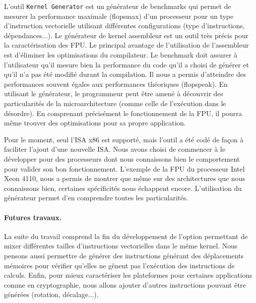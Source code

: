     L'outil \verb=Kernel Generator= est un générateur de benchmarks qui permet de mesurer la performance maximale (\gls{flopsmax})  d'un processeur pour un type d'instruction vectorielle utilisant différentes configurations (type d'instructions, dépendances...).
    Le générateur de kernel assembleur est un outil très précis pour la caractérisation des \gls{FPU}. Le principal avantage de l'utilisation de l'assembleur est d'éliminer les optimisations du compilateur. Le benchmark doit assurer à l'utilisateur qu'il mesure bien la performance du code qu'il a choisi de générer et qu'il n'a pas été modifié durant la compilation. Il nous a permis d'atteindre des performances souvent égales aux performances théoriques (\gls{flopspeak}). En utilisant le générateur, le programmeur peut être amené à découvrir des particularités de la microarchitecture (comme celle de l'exécution dans le désordre). En comprenant précisément le fonctionnement de la FPU, il pourra même trouver des optimisations pour sa propre application.
    
    Pour le moment, seul l'ISA x86 est supporté, mais l'outil a été codé de façon à faciliter l'ajout d'une nouvelle ISA. Nous avons choisi de commencer à le développer pour des processeurs dont nous connaissons bien le comportement pour valider son bon fonctionnement. L'exemple de la FPU du processeur Intel Xeon 4110, nous a permis de montrer que même sur des architectures que nous connaissons bien, certaines spécificités nous échappent encore. L'utilisation du générateur permet d'en comprendre toutes les particularités.
    
    
    \paragraph{Futures travaux.} La suite du travail comprend la fin du développement de l'option permettant de mixer différentes tailles d'instructions vectorielles dans le même kernel. Nous pensons aussi permettre de générer des instructions générant des déplacements mémoires pour vérifier qu'elles ne gênent pas l'exécution des instructions de calculs. Enfin, pour mieux caractériser les plateformes pour certaines applications comme en cryptographie, nous allons ajouter d'autres instructions pouvant être générées (rotation, décalage...).
    
    